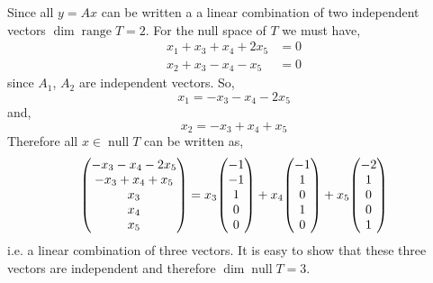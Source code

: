 \documentclass[11pt,a4paper]{scrartcl}
\DeclareMathOperator{\range}{range}
\DeclareMathOperator{\nspace}{null}
\begin{document}
{    Since all $y=Ax$ can be written a a linear combination of two
    independent vectors $\dim \range T=2$. For the null space of $T$
    we must have,
    \begin{align*}
        x_1+x_3+x_4+2x_5 &=0 \\
        x_2+x_3-x_4-x_5 & =0
    \end{align*}
    since $A_1$, $A_2$ are independent vectors. So,
    \[
        x_1=-x_3-x_4-2x_5
    \]
    and,
    \[
        x_2=-x_3+x_4+x_5
    \]
    Therefore all $x \in \nspace T$ can be written as,
    \[
    \mqty(
        -x_3-x_4-2x_5 \\ -x_3+x_4+x_5 \\ x_3 \\ x_4 \\ x_5
    )    
    =
    x_3 \mqty(
        -1 \\ -1 \\ 1 \\ 0 \\ 0
    )   
    +
    x_4 \mqty(
        -1 \\ 1 \\ 0 \\ 1 \\ 0
    )  
    +
    x_5 \mqty(
        -2 \\ 1 \\ 0 \\ 0 \\ 1
    )  
    \]
    i.e. a linear combination of three vectors. It is easy to show that
    these three vectors are independent and therefore $\dim \nspace T=3$.
}
\end{document}
